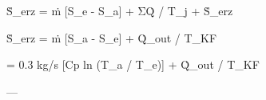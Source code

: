 Ṡ_erz = ṁ [S_e - S_a] + ΣQ̇ / T_j + Ṡ_erz  

Ṡ_erz = ṁ [S_a - S_e] + Q̇_out / T_KF  

= 0.3 kg/s [Cp ln (T_a / T_e)] + Q̇_out / T_KF  

---